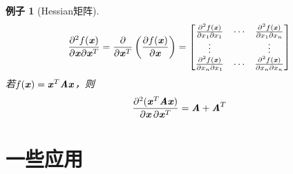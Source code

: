 \documentclass[UTF8]{ctexart}
\newtheorem{exam}{例子}
\begin{document}
\begin{exam}[Hessian矩阵]
    \[
        \frac{\partial^2 f(\Vx)}{\partial \Vx \partial \Vx^T } = \frac{\partial}{\partial \Vx^T} \left(\frac{\partial f(\Vx)}{\partial \Vx} \right) = \begin{bmatrix}
            \frac{\partial^2 f(\Vx)}{\partial x_1 \partial x_1} &  \cdots & \frac{\partial^2 f(\Vx)}{\partial x_1 \partial x_n} \\
            \vdots & & \vdots \\
            \frac{\partial^2 f(\Vx)}{\partial x_n \partial x_1} &  \cdots & \frac{\partial^2 f(\Vx)}{\partial x_n \partial x_n}
        \end{bmatrix}
    \]
若$f(\Vx) = \Vx^T\MA\Vx$，则
    \[
        \frac{\partial^2(\Vx^T\MA\Vx)}{\partial \Vx \, \partial \Vx^T} = \MA + \MA^T
    \]
\end{exam}

\section{一些应用}
\label{sec:yi_xie_ying_yong_}
\end{document}

